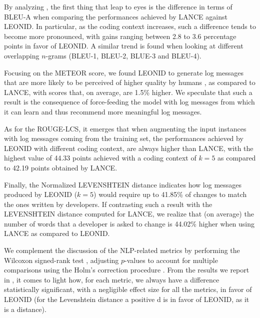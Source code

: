 By analyzing , the first thing that leap to eyes is the difference in terms of BLEU-A when comparing the performances achieved by LANCE against LEONID. In particular, as the coding context increases, such a difference tends to become more pronounced, with gains ranging between 2.8 to 3.6 percentage points in favor of LEONID. A similar trend is found when looking at different overlapping $n$-grams (\ie BLEU-1, BLEU-2, BLUE-3 and BLEU-4). 

Focusing on the METEOR score, we found LEONID to generate log messages that are more likely to be perceived of higher quality by humans \cite{meteor}, as compared to LANCE, with scores that, on average, are 1.5\% higher. We speculate that such a result is the consequence of force-feeding the model with log messages from which it can learn and thus recommend more meaningful log messages.

As for the ROUGE-LCS, it emerges that when augmenting the input instances with log messages coming from the training set, the performances achieved by LEONID with different coding context, are always higher than LANCE, with the highest value of 44.33 points achieved with a coding context of $k=5$ as compared to 42.19 points obtained by LANCE.

Finally, the Normalized LEVENSHTEIN distance indicates how log messages produced by LEONID ($k=5$) would require up to 41.85\% of changes to match the ones written by developers. If contrasting such a result with the LEVENSHTEIN distance computed for LANCE, we realize that (on average) the number of words that a developer is asked to change is 44.02\% higher when using LANCE as compared to LEONID.

We complement the discussion of the NLP-related metrics by performing the Wilcoxon signed-rank test \cite{wilcoxon}, adjusting $p$-values to account for multiple comparisons using the Holm's correction procedure \cite{Holm1979a}. 
From the results we report in , it comes to light how, for each metric, we always have a difference statistically significant, with a negligible effect size for all the metrics, in favor of LEONID (for the Levenshtein distance a positive d is in favor of LEONID, as it is a distance). 

